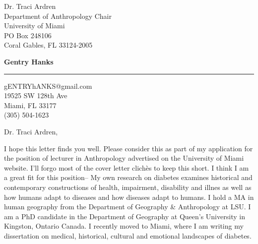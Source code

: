 \documentclass[10pt]{letter} %
\begin{document}
\begin{letter}{Dr. Traci Ardren \\
Department of Anthropology Chair \\
University of Miami \\
PO Box 248106 \\
Coral Gables, FL 33124-2005}


\begin{flushright}
\large\bf Gentry Hanks \\ %
\vspace{15pt} \hrule height 1pt %
gENTRYhANKS@gmail.com \\
19525 SW 128th Ave \\ 
Miami, FL 33177 \\ 
(305) 504-1623 \\%
\end{flushright} 

\signature{Gentry Hanks} %


\opening{Dr. Traci Ardren,} 

I hope this letter finds you well. Please consider this as part of my application for the position of lecturer in Anthropology advertised on the University of Miami website. I'll forgo most of the cover letter  clich\`{e}s to keep this short. I think I am a great fit for this position-- My own research on diabetes examines historical and contemporary constructions of health, impairment, disability and illnes as well as how humans adapt to diseases and how diseases adapt to humans. I hold a MA in human geography from the Department of Geography \& Anthropology at LSU. I am a PhD candidate in the Department of Geography at Queen's University in Kingston, Ontario Canada. I recently moved to Miami, where I am writing my dissertation on medical, historical, cultural and emotional landscapes of diabetes.


\end{letter}
\end{document}
